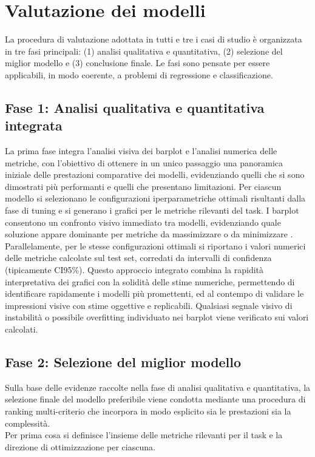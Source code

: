 \documentclass[a4paper,12pt]{report}
\begin{document}
	\section{Valutazione dei modelli}
	
	La procedura di valutazione adottata in tutti e tre i casi di studio è organizzata in tre fasi principali: (1) analisi qualitativa e quantitativa, (2) selezione del miglior modello e (3) conclusione finale. Le fasi sono pensate per essere applicabili, in modo coerente, a problemi di regressione e classificazione.
	
	\subsection{Fase 1: Analisi qualitativa e quantitativa integrata}
	La prima fase integra l'analisi visiva dei barplot e l'analisi numerica delle metriche, con l'obiettivo di ottenere in un unico passaggio una panoramica iniziale delle prestazioni comparative dei modelli, evidenziando quelli che si sono dimostrati più performanti e quelli che presentano limitazioni. Per ciascun modello si selezionano le configurazioni iperparametriche ottimali risultanti dalla fase di tuning e si generano i grafici per le metriche rilevanti del task. I barplot consentono un confronto visivo immediato tra modelli, evidenziando quale soluzione appare dominante per metriche da massimizzare o da minimizzare . Parallelamente, per le stesse configurazioni ottimali si riportano i valori numerici delle metriche calcolate sul test set, corredati da intervalli di confidenza (tipicamente CI95\%). Questo approccio integrato combina la rapidità interpretativa dei grafici con la solidità delle stime numeriche, permettendo di identificare rapidamente i modelli più promettenti, ed al contempo di validare le impressioni visive con stime oggettive e replicabili. Qualsiasi segnale visivo di instabilità o possibile overfitting individuato nei barplot viene verificato sui valori calcolati.
	
	\subsection{Fase 2: Selezione del miglior modello}
	Sulla base delle evidenze raccolte nella fase di analisi qualitativa e quantitativa, la selezione finale del modello preferibile viene condotta mediante una procedura di ranking multi-criterio che incorpora in modo esplicito sia le prestazioni sia la complessità. \\
	Per prima cosa si definisce l'insieme delle metriche rilevanti per il task e la direzione di ottimizzazione per ciascuna. \\
	
\end{document}
